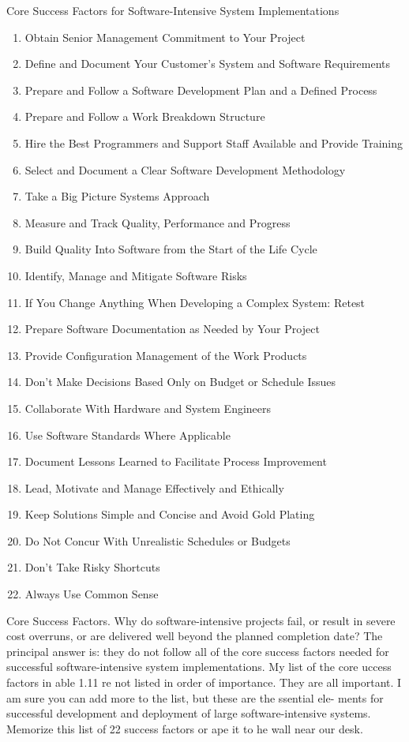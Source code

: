 \documentclass{book}
\begin{document}
\begin{multicols}{2}
\begin{table}
	\caption{Core Success Factors for Software-Intensive
		System Implementations}
	\begin{enumerate}
		\item Obtain Senior Management Commitment to Your Project
		\item  Define and Document Your Customer’s System and Software Requirements
		\item  Prepare and Follow a Software Development Plan and a Defined Process
		\item Prepare and Follow a Work Breakdown Structure
		\item Hire the Best Programmers and Support Staff Available and Provide Training
		\item Select and Document a Clear Software Development Methodology
		\item Take a Big Picture Systems Approach
		\item Measure and Track Quality, Performance and Progress
		\item Build Quality Into Software from the Start of the Life Cycle
		\item Identify, Manage and Mitigate Software Risks
		\item If You Change Anything When Developing a Complex System: Retest
		\item Prepare Software Documentation as Needed by Your Project
		\item Provide Configuration Management of the Work Products
		\item Don’t Make Decisions Based Only on Budget or Schedule Issues
		\item Collaborate With Hardware and System Engineers
		\item Use Software Standards Where Applicable
		\item Document Lessons Learned to Facilitate Process Improvement
		\item Lead, Motivate and Manage Effectively and Ethically
		\item Keep Solutions Simple and Concise and Avoid Gold Plating
		\item Do Not Concur With Unrealistic Schedules or Budgets
		\item Don’t Take Risky Shortcuts
		\item Always Use Common Sense
	\end{enumerate}
\end{table}

Core Success Factors. Why do software-intensive projects
fail, or result in severe cost overruns, or are delivered well
beyond the planned completion date? The principal answer
is: they do not follow all of the core success factors needed for
successful software-intensive system implementations. My
list of the core uccess factors in able 1.11 re not listed
in order of importance. They are all important. I am sure
you can add more to the list, but these are the ssential ele-
ments for successful development and deployment of large
software-intensive systems. Memorize this list of 22 success
factors or ape it to he wall near our desk.
 
\end{multicols}
\end{document}

